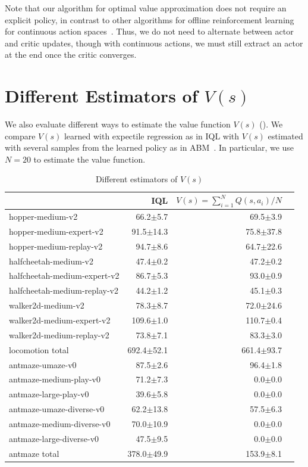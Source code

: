 Note that our algorithm for optimal value approximation does not require an explicit policy, in contrast to other algorithms for offline reinforcement learning for continuous action spaces~\citep{fujimoto2019off, fujimoto2021minimalist, wu2019behavior, kostrikov2021offline, kumar2019stabilizing, kumar2020conservative}. Thus, we do not need to alternate between actor and critic updates, though with continuous actions, we must still extract an actor at the end once the critic converges.

\section{Different Estimators of $V(s)$}

{
We also evaluate different ways to estimate the value function $V(s)$ (). We compare $V(s)$ learned with expectile regression as in IQL with $V(s)$ estimated with several samples from the learned policy as in ABM~\citep{siegel2020keep}. In particular, we use $N=20$ to estimate the value function.}


\begin{table}[!htp]\centering
\caption{Different estimators of $V(s)$}\label{tab:abm}
\begin{tabular}{L{7cm}|rrr}
& IQL & $V(s)=\sum_{i=1}^N Q(s,a_i) / N$ \\\hline
hopper-medium-v2 &66.2$\pm$5.7 &69.5$\pm$3.9 \\
hopper-medium-expert-v2 &91.5$\pm$14.3 &75.8$\pm$37.8 \\
hopper-medium-replay-v2 &94.7$\pm$8.6 &64.7$\pm$22.6 \\
halfcheetah-medium-v2 &47.4$\pm$0.2 &47.2$\pm$0.2 \\
halfcheetah-medium-expert-v2 &86.7$\pm$5.3 &93.0$\pm$0.9 \\
halfcheetah-medium-replay-v2 &44.2$\pm$1.2 &45.1$\pm$0.3 \\
walker2d-medium-v2 &78.3$\pm$8.7 &72.0$\pm$24.6 \\
walker2d-medium-expert-v2 &109.6$\pm$1.0 &110.7$\pm$0.4 \\
walker2d-medium-replay-v2 &73.8$\pm$7.1 &83.3$\pm$3.0 \\ \hline
locomotion total &692.4$\pm$52.1 &661.4$\pm$93.7 \\ \hline
antmaze-umaze-v0 &87.5$\pm$2.6 &96.4$\pm$1.8 \\
antmaze-medium-play-v0 &71.2$\pm$7.3 &0.0$\pm$0.0 \\
antmaze-large-play-v0 &39.6$\pm$5.8 &0.0$\pm$0.0 \\
antmaze-umaze-diverse-v0 &62.2$\pm$13.8 &57.5$\pm$6.3 \\
antmaze-medium-diverse-v0 &70.0$\pm$10.9 &0.0$\pm$0.0 \\
antmaze-large-diverse-v0 &47.5$\pm$9.5 &0.0$\pm$0.0 \\ \hline
antmaze total &378.0$\pm$49.9 &153.9$\pm$8.1 \\
\end{tabular}
\end{table}
%
